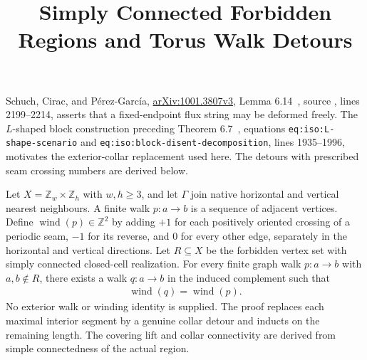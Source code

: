 \documentclass{article}
\title{Simply Connected Forbidden Regions and Torus Walk Detours}
\author{}
\date{}
\begin{document}
\maketitle
{}

Schuch, Cirac, and P\'erez-Garc\'ia,
\href{https://arxiv.org/abs/1001.3807v3}{arXiv:1001.3807v3},
Lemma 6.14~\cite[Lemma~6.14]{Schuch2010PEPS}, source , lines 2199--2214,
asserts that a fixed-endpoint flux string may be deformed freely. The $L$-shaped block construction
preceding Theorem 6.7~\cite{Schuch2010PEPS}, equations
\texttt{eq:iso:L-shape-scenario} and \texttt{eq:iso:block-disent-decomposition},
lines 1935--1996, motivates the exterior-collar replacement used here.
The detours with prescribed seam crossing numbers are derived below.

Let $X=\mathbb Z_w\times\mathbb Z_h$ with $w,h\geq3$, and let $\Gamma$
join native horizontal and vertical nearest neighbours. A finite walk
$p:a\to b$ is a sequence of adjacent vertices. Define
$\operatorname{wind}(p)\in\mathbb Z^2$ by adding $+1$ for each positively
oriented crossing of a periodic seam, $-1$ for its reverse, and $0$
for every other edge, separately in the horizontal and vertical directions.
Let $R\subseteq X$ be the forbidden vertex set with simply
connected closed-cell realization. For every finite graph walk $p:a\to b$
with $a,b\notin R$, there exists a walk $q:a\to b$ in the induced complement
such that
\begin{align}
    \operatorname{wind}(q)=\operatorname{wind}(p).
    \label{eq:flux_avoidance_winding}
\end{align}
No exterior
walk or winding identity is supplied. The proof replaces each maximal
interior segment by a genuine collar detour and inducts on the remaining
length. The covering lift and collar connectivity are derived from simple
connectedness of the actual region.
\end{document}
